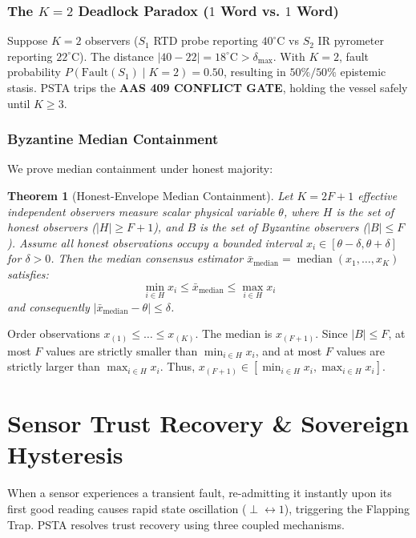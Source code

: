 \documentclass[conference]{IEEEtran}
\begin{document}
\subsubsection{The $K=2$ Deadlock Paradox ($1$ Word vs. $1$ Word)}
Suppose $K=2$ observers ($S_1$ RTD probe reporting $40^\circ\text{C}$ vs $S_2$ IR pyrometer reporting $22^\circ\text{C}$). The distance $|40 - 22| = 18^\circ\text{C} > \delta_{\text{max}}$. With $K=2$, fault probability $P(\text{Fault}(S_1) \mid K=2) = 0.50$, resulting in $50\%/50\%$ epistemic stasis. PSTA trips the \textbf{AAS 409 CONFLICT GATE}, holding the vessel safely until $K \ge 3$.

\subsubsection{Byzantine Median Containment}
We prove median containment under honest majority:

\newtheorem{theorem}{Theorem}
\begin{theorem}[Honest-Envelope Median Containment]
Let $K = 2F + 1$ effective independent observers measure scalar physical variable $\theta$, where $H$ is the set of honest observers ($|H| \ge F + 1$), and $B$ is the set of Byzantine observers ($|B| \le F$). Assume all honest observations occupy a bounded interval $x_i \in [\theta - \delta, \theta + \delta]$ for $\delta > 0$. Then the median consensus estimator $\bar{x}_{\text{median}} = \operatorname{median}(x_1, \dots, x_K)$ satisfies:
\begin{equation}
\min_{i \in H} x_i \le \bar{x}_{\text{median}} \le \max_{i \in H} x_i
\end{equation}
and consequently $|\bar{x}_{\text{median}} - \theta| \le \delta$.
\end{theorem}

\begin{IEEEproof}
Order observations $x_{(1)} \le \dots \le x_{(K)}$. The median is $x_{(F+1)}$. Since $|B| \le F$, at most $F$ values are strictly smaller than $\min_{i \in H} x_i$, and at most $F$ values are strictly larger than $\max_{i \in H} x_i$. Thus, $x_{(F+1)} \in [\min_{i \in H} x_i, \max_{i \in H} x_i]$.
\end{IEEEproof}

\section{Sensor Trust Recovery \& Sovereign Hysteresis}

When a sensor experiences a transient fault, re-admitting it instantly upon its first good reading causes rapid state oscillation ($\perp \leftrightarrow 1$), triggering the Flapping Trap. PSTA resolves trust recovery using three coupled mechanisms.
\end{document}
